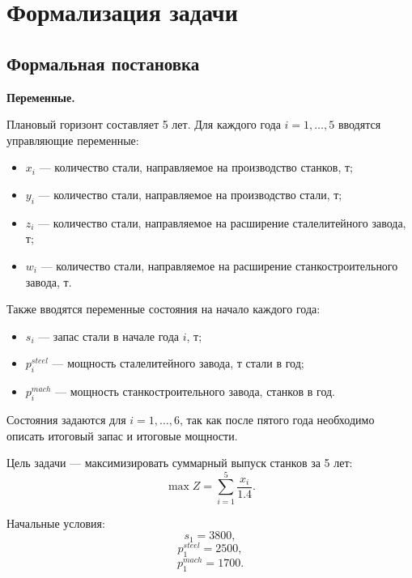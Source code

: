 \documentclass[a4paper,12pt]{article}
\begin{document}
\section{Формализация задачи}

\subsection{Формальная постановка}

\textbf{Переменные.}

Плановый горизонт составляет 5 лет. Для каждого года $i = 1,\dots,5$
вводятся управляющие переменные:
\begin{itemize}
    \item $x_i$ --- количество стали, направляемое на производство станков, т;
    \item $y_i$ --- количество стали, направляемое на производство стали, т;
    \item $z_i$ --- количество стали, направляемое на расширение
    сталелитейного завода, т;
    \item $w_i$ --- количество стали, направляемое на расширение
    станкостроительного завода, т.
\end{itemize}

Также вводятся переменные состояния на начало каждого года:
\begin{itemize}
    \item $s_i$ --- запас стали в начале года $i$, т;
    \item $p_i^{steel}$ --- мощность сталелитейного завода, т стали в год;
    \item $p_i^{mach}$ --- мощность станкостроительного завода, станков в год.
\end{itemize}

Состояния задаются для $i = 1,\dots,6$, так как после пятого года необходимо
описать итоговый запас и итоговые мощности.

Цель задачи --- максимизировать суммарный выпуск станков за 5 лет:
\begin{equation}
\max Z = \sum_{i=1}^{5} \frac{x_i}{1.4}.
\end{equation}

Начальные условия:
\begin{equation}
s_1 = 3800,
\end{equation}
\begin{equation}
p_1^{steel} = 2500,
\end{equation}
\begin{equation}
p_1^{mach} = 1700.
\end{equation}
\end{document}
